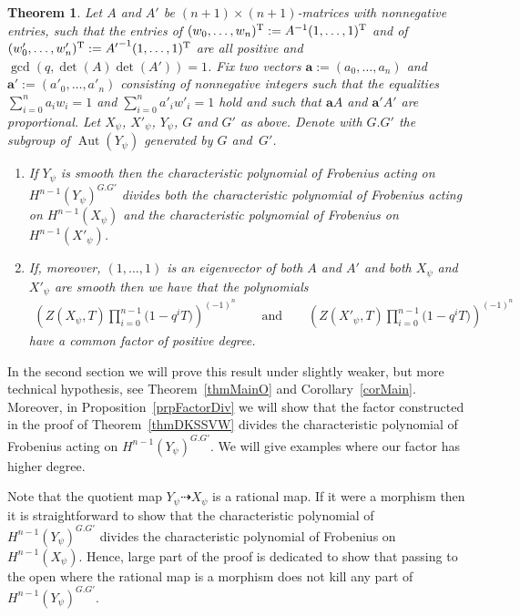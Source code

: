 \documentclass[pdftex]{sigma}
\numberwithin{equation}{section}
\newtheorem{Theorem}{Theorem}[section]
\DeclareMathOperator{\Aut}{Aut}
\begin{document}
\begin{Theorem}\label{thmMain} Let $A$ and $A'$ be $(n+1)\times (n+1)$-matrices with nonnegative entries, such that the entries of $ (w_0,\dots,w_n)^{\rm T}:=A^{-1} (1,\dots,1)^{\rm T}$ and of $(w'_0,\dots,w'_n)^{\rm T}:={A'}^{-1}(1,\dots,1)^{\rm T}$ are all positive and $\gcd(q,\det(A)\det(A'))=1$. Fix two vectors $\mathbf{a}:=(a_0,\dots,a_n)$ and $\mathbf{a}':=(a'_0,\dots,a'_n)$ consisting of nonnegative integers such that the equalities $\sum\limits_{i=0}^n a_iw_i=1$ and $\sum\limits_{i=0}^n a'_iw'_i=1$ hold and such that $\mathbf{a} A$ and $\mathbf{a}' A'$ are proportional. Let $X_\psi$, $X'_\psi$, $Y_\psi$, $G$ and $G'$ as above. Denote with $G.G'$ the subgroup of $\Aut(Y_\psi)$ generated by $G$ and~$G'$.
\begin{enumerate}\itemsep=0pt
\item[$1.$] If $Y_\psi$ is smooth then the characteristic polynomial of Frobenius acting on $H^{n-1}(Y_{\psi})^{G.G'}$ divides both the characteristic polynomial of Frobenius acting on $H^{n-1}(X_\psi)$ and the cha\-rac\-teristic polynomial of Frobenius on~$H^{n-1}(X'_\psi)$.

\item[$2.$] If, moreover, $(1,\dots,1)$ is an eigenvector of both $A$ and $A'$ and both $X_\psi$ and $X'_\psi$ are smooth then we have that the polynomials
\begin{gather*} \left(Z(X_{\psi},T)\prod_{i=0}^{n-1}\big(1-q^iT\big) \right)^{(-1)^{n}}\qquad
\text{and} \qquad \left(Z(X'_{\psi},T)\prod_{i=0}^{n-1}\big(1-q^iT\big) \right)^{(-1)^{n}}\end{gather*}
have a common factor of positive degree.
\end{enumerate}
\end{Theorem}

In the second section we will prove this result under slightly weaker, but more technical hypothesis, see Theorem~\ref{thmMainO} and Corollary~\ref{corMain}. Moreover, in Proposition~\ref{prpFactorDiv} we will show that the factor constructed in the proof of Theorem~\ref{thmDKSSVW} divides the characteristic polynomial of Frobenius acting on $H^{n-1}(Y_\psi)^{G.G'}$. We will give examples where our factor has higher degree.

Note that the quotient map $Y_\psi\dashrightarrow X_{\psi}$ is a rational map. If it were a morphism then it is straightforward to show that the characteristic polynomial of $H^{n-1}(Y_{\psi})^{G.G'}$ divides the characteristic polynomial of Frobenius on $H^{n-1}(X_\psi)$. Hence, large part of the proof is dedicated to show that passing to the open where the rational map is a morphism does not kill any part of $H^{n-1}(Y_{\psi})^{G.G'}$.
\end{document}
